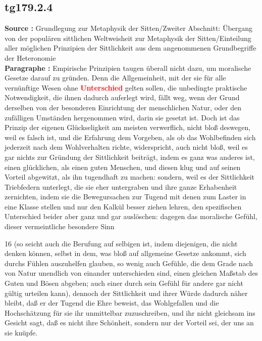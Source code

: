 \documentclass[a4paper,12pt,twoside]{book}
\newcommand{\match}[1]{\textcolor{red}{\textbf{#1}}}
\begin{document}
	\subsection*{tg179.2.4} 
	\textbf{Source : }Grundlegung zur Metaphysik der Sitten/Zweiter Abschnitt: Übergang von der populären sittlichen Weltweisheit zur Metaphysik der Sitten/Einteilung aller möglichen Prinzipien der Sittlichkeit aus dem angenommenen Grundbegriffe der Heteronomie\\  
	
	\noindent\textbf{Paragraphe : }
	Empirische Prinzipien taugen überall nicht dazu, um moralische Gesetze darauf zu gründen. Denn die Allgemeinheit, mit der sie für alle vernünftige Wesen ohne \match{Unterschied} gelten sollen, die unbedingte praktische Notwendigkeit, die ihnen dadurch auferlegt wird, fällt weg, wenn der Grund derselben von der besonderen Einrichtung der menschlichen Natur, oder den zufälligen Umständen hergenommen wird, darin sie gesetzt ist. Doch  ist das Prinzip der eigenen Glückseligkeit am meisten verwerflich, nicht bloß deswegen, weil es falsch ist, und die Erfahrung dem Vorgeben, als ob das Wohlbefinden sich jederzeit nach dem Wohlverhalten richte, widerspricht, auch nicht bloß, weil es gar nichts zur Gründung der Sittlichkeit beiträgt, indem es ganz was anderes ist, einen glücklichen, als einen guten Menschen, und diesen klug und auf seinen Vorteil abgewitzt, als ihn tugendhaft zu machen: sondern, weil es der Sittlichkeit Triebfedern unterlegt, die sie eher untergraben und ihre ganze Erhabenheit zernichten, indem sie die Bewegursachen zur Tugend mit denen zum Laster in eine Klasse stellen und nur den Kalkül besser ziehen lehren, den spezifischen Unterschied beider aber ganz und gar auslöschen: dagegen das moralische Gefühl, dieser vermeintliche besondere Sinn
	
	
	16
	(so seicht auch die Berufung auf selbigen ist, indem diejenigen, die nicht denken können, selbst in dem, was bloß auf allgemeine Gesetze ankommt, sich durchs Fühlen auszuhelfen glauben, so wenig auch Gefühle, die dem Grade nach von Natur unendlich von einander unterschieden sind, einen gleichen Maßstab des Guten und Bösen abgeben; auch einer durch sein Gefühl für andere gar nicht gültig urteilen kann), dennoch der Sittlichkeit und ihrer Würde dadurch näher bleibt, daß er der Tugend die Ehre beweist, das Wohlgefallen und die Hochschätzung für sie ihr unmittelbar zuzuschreiben, und ihr nicht gleichsam ins Gesicht sagt, daß es nicht ihre Schönheit, sondern nur der Vorteil sei, der uns an sie knüpfe. 
	
\end{document}
